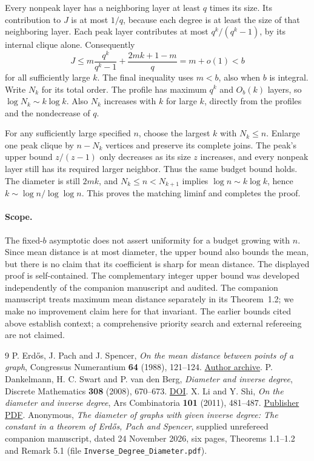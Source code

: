 \documentclass[10pt]{article}
\begin{document}
Every nonpeak layer has a neighboring layer at least $q$ times its size. Its contribution to $J$ is at most $1/q$, because each degree is at least the size of that neighboring layer. Each peak layer contributes at most $q^k/(q^k-1)$, by its internal clique alone. Consequently
\[
 J\le m\frac{q^k}{q^k-1}+\frac{2mk+1-m}{q}=m+o(1)<b
\]
for all sufficiently large $k$. The final inequality uses $m<b$, also when $b$ is integral. Write $N_k$ for its total order. The profile has maximum $q^k$ and $O_b(k)$ layers, so $\log N_k\sim k\log k$. Also $N_k$ increases with $k$ for large $k$, directly from the profiles and the nondecrease of $q$.

For any sufficiently large specified $n$, choose the largest $k$ with $N_k\le n$. Enlarge one peak clique by $n-N_k$ vertices and preserve its complete joins. The peak's upper bound $z/(z-1)$ only decreases as its size $z$ increases, and every nonpeak layer still has its required larger neighbor. Thus the same budget bound holds. The diameter is still $2mk$, and $N_k\le n<N_{k+1}$ implies $\log n\sim k\log k$, hence $k\sim\log n/\log\log n$. This proves the matching liminf and completes the proof.

\paragraph{Scope.} The fixed-$b$ asymptotic does not assert uniformity for a budget growing with $n$. Since mean distance is at most diameter, the upper bound also bounds the mean, but there is no claim that its coefficient is sharp for mean distance. The displayed proof is self-contained. The complementary integer upper bound was developed independently of the companion manuscript and audited. The companion manuscript treats maximum mean distance separately in its Theorem~1.2; we make no improvement claim here for that invariant. The earlier bounds cited above establish context; a comprehensive priority search and external refereeing are not claimed.

\begin{thebibliography}{9}
 P. Erd\H{o}s, J. Pach and J. Spencer, \emph{On the mean distance between points of a graph}, Congressus Numerantium \textbf{64} (1988), 121--124. \href{https://www.renyi.hu/~p_erdos/1988-23.pdf}{Author archive}.
 P. Dankelmann, H. C. Swart and P. van den Berg, \emph{Diameter and inverse degree}, Discrete Mathematics \textbf{308} (2008), 670--673. \href{https://doi.org/10.1016/j.disc.2007.07.053}{DOI}.
 X. Li and Y. Shi, \emph{On the diameter and inverse degree}, Ars Combinatoria \textbf{101} (2011), 481--487. \href{https://combinatorialpress.com/article/ars/Volume%20101/volume-101-paper-36.pdf}{Publisher PDF}.
 Anonymous, \emph{The diameter of graphs with given inverse degree: The constant in a theorem of Erd\H{o}s, Pach and Spencer}, supplied unrefereed companion manuscript, dated 24 November 2026, six pages, Theorems 1.1--1.2 and Remark 5.1 (file \texttt{Inverse\_Degree\_Diameter.pdf}).
\end{thebibliography}
\end{document}
